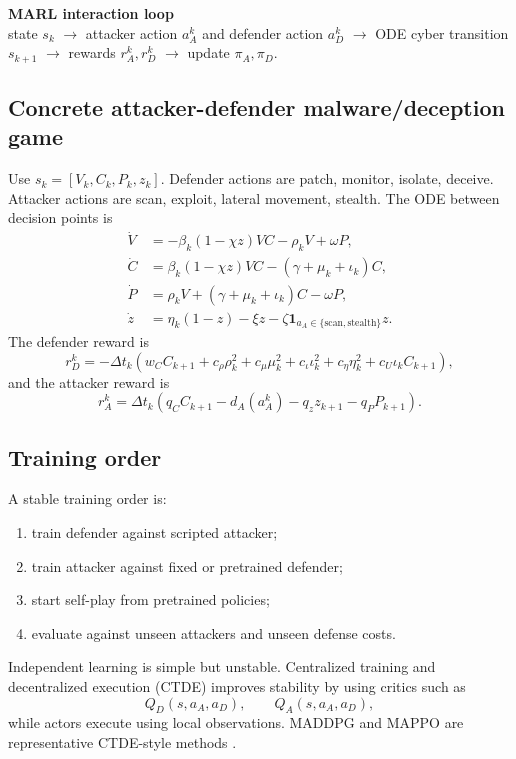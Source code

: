 \documentclass[11pt,a4paper]{article}
\begin{document}
\begin{flowbox}
\textbf{MARL interaction loop}\\[0.3em]
state $s_k$ $\rightarrow$ attacker action $a_A^k$ and defender action $a_D^k$ $\rightarrow$ ODE cyber transition $s_{k+1}$ $\rightarrow$ rewards $r_A^k,r_D^k$ $\rightarrow$ update $\pi_A,\pi_D$.
\end{flowbox}

\subsection{Concrete attacker-defender malware/deception game}
Use $s_k=[V_k,C_k,P_k,z_k]$. Defender actions are patch, monitor, isolate, deceive. Attacker actions are scan, exploit, lateral movement, stealth. The ODE between decision points is
\begin{align}
\dot{V}&=-\beta_k(1-\chi z)VC-\rho_kV+\omega P,\\
\dot{C}&=\beta_k(1-\chi z)VC-(\gamma+\mu_k+\iota_k)C,\\
\dot{P}&=\rho_kV+(\gamma+\mu_k+\iota_k)C-\omega P,\\
\dot{z}&=\eta_k(1-z)-\xi z-\zeta\mathbf{1}_{a_A\in\{\text{scan},\text{stealth}\}}z.
\end{align}
The defender reward is
\begin{equation}
r_D^k=-\Delta t_k\left(w_CC_{k+1}+c_\rho\rho_k^2+c_\mu\mu_k^2+c_\iota\iota_k^2+c_\eta\eta_k^2+c_U\iota_kC_{k+1}\right),
\end{equation}
and the attacker reward is
\begin{equation}
r_A^k=\Delta t_k\left(q_CC_{k+1}-d_A(a_A^k)-q_zz_{k+1}-q_PP_{k+1}\right).
\end{equation}

\subsection{Training order}
A stable training order is:
\begin{enumerate}
\item train defender against scripted attacker;
\item train attacker against fixed or pretrained defender;
\item start self-play from pretrained policies;
\item evaluate against unseen attackers and unseen defense costs.
\end{enumerate}
Independent learning is simple but unstable. Centralized training and decentralized execution (CTDE) improves stability by using critics such as
\begin{equation}
Q_D(s,a_A,a_D),\qquad Q_A(s,a_A,a_D),
\end{equation}
while actors execute using local observations. MADDPG and MAPPO are representative CTDE-style methods \cite{lowe2017,yu2021mappo}.
\end{document}
